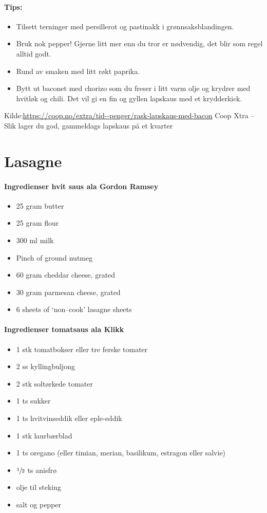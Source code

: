 \documentclass[12pt,a4paper]{book}
\begin{document}
\paragraph{Tips:}
\begin{itemize}[noitemsep]
	\item Tilsett terninger med persillerot og pastinakk i grønnsaksblandingen.
	\item Bruk nok pepper! Gjerne litt mer enn du tror er nødvendig, det blir som regel alltid godt.
	\item Rund av smaken med litt røkt paprika.
	\item   Bytt ut baconet med chorizo som du freser i litt varm olje og krydrer med hvitløk og chili. Det vil gi en fin og gyllen lapskaus med et krydderkick.
\end{itemize}

Kilde:\url{https://coop.no/extra/tid--penger/rask-lapskaus-med-bacon} Coop Xtra -- Slik lager du god, gammeldags lapskaus på et kvarter
\clearpage{}
\clearpage{}\section{﻿Lasagne}


\paragraph{Ingredienser hvit saus ala Gordon Ramsey}
\begin{itemize}[noitemsep]
	\item 25 gram butter
	\item 25 gram flour
	\item 300 ml milk
	\item Pinch of ground nutmeg
	\item 60 gram cheddar cheese, grated
	\item 30 gram parmesan cheese, grated
	\item 6 sheets of `non--cook' lasagne sheets
\end{itemize}

\paragraph{Ingredienser tomatsaus ala Klikk}
\begin{itemize}[noitemsep]
	\item 1 stk tomatbokser eller tre ferske tomater
	\item 2 ss kyllingbuljong
	\item 2 stk soltørkede tomater
	\item 1 ts sukker
	\item 1 ts hvitvinseddik eller eple-eddik
	\item 1 stk laurbærblad
	\item 1 ts oregano (eller timian, merian, basilikum, estragon eller salvie)
	\item  $\sfrac{1}{2}$  ts anisfrø
	\item olje til steking
	\item salt og pepper
\end{itemize}
\end{document}
